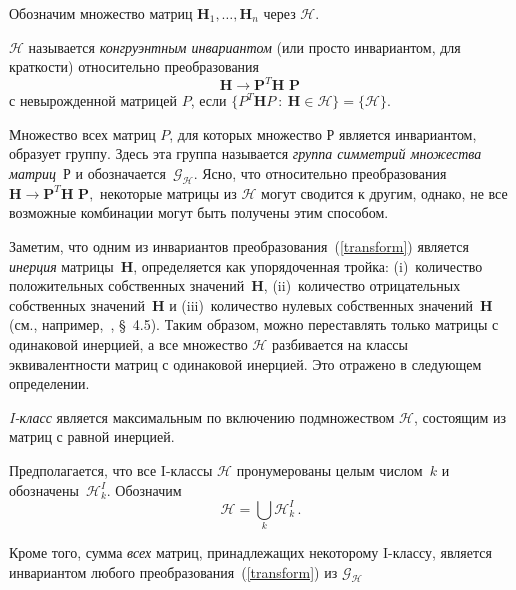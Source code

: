 Обозначим множество матриц $\textbf{H}_1,\dots,\textbf{H}_n$ через ${\mathcal{H}}$.

\begin{definition} \label{def:invariance}
${\mathcal H}$ называется {\em конгруэнтным инвариантом} (или просто инвариантом, для краткости) относительно преобразования 
%
\begin{equation}
\label{transform}
\textbf{H} \to \textbf{P}^T \textbf{H P} \,
\end{equation}
%
с невырожденной матрицей $P$, если $\{P^T \textbf{H} P \ : \ \textbf{H} \in {\mathcal H}\}= \{\mathcal H\}$.
\end{definition}

Множество всех матриц $P$, для которых множество ${\mathcal{Р}}$ является инвариантом, образует группу. Здесь эта группа называется {\em группа симметрий множества матриц}~${\mathcal{Р}}$ и обозначается~${\mathcal{G}}_{\mathcal{H}}$. Ясно, что относительно преобразования $\textbf{H} \to \textbf{P}^T \textbf{H P},$ некоторые матрицы из $\mathcal{H}$ могут сводится к другим, однако, не все возможные комбинации могут быть получены этим способом.

Заметим, что одним из инвариантов преобразования~(\ref{transform}) является {\em инерция} матрицы~$\textbf{H}$,
определяется как упорядоченная тройка: (i)~количество положительных собственных значений~$\textbf{H}$, (ii)~количество отрицательных собственных значений~$\textbf{H}$ и (iii)~количество нулевых собственных значений~$\textbf{H}$ (см., например,~\cite{HJ}, \S~4.5). Таким образом, можно переставлять только матрицы с одинаковой инерцией, а все множество ${\mathcal{H}}$ разбивается на классы эквивалентности матриц с одинаковой инерцией. Это отражено в следующем определении.
\begin{definition}
{\em I-класс} является максимальным по включению подмножеством ${\mathcal{H}}$, состоящим из матриц с равной инерцией.
\end{definition}

Предполагается, что все I-классы ${\mathcal{H}}$ пронумерованы целым числом~$k$ и обозначены~${\mathcal{H}}^I_k$. Обозначим
%
\begin{equation}
{\mathcal{H}} = \bigcup_k {\mathcal{H}}^I_k \, .
\end{equation}
%

Кроме того, сумма \textit{всех} матриц, принадлежащих некоторому I-классу, является инвариантом любого преобразования~(\ref{transform}) из ${\mathcal{G}}_{\mathcal{H}} $

